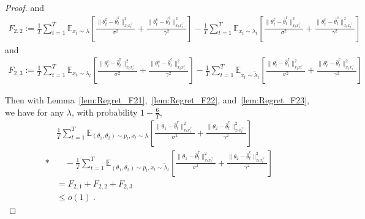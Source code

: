 \documentclass[10pt,a4paper]{amsart}
\newcommand{\hthetact}{\hat{\theta}_t^{\mathrm{c}}}
\newcommand{\hthetart}{\hat{\theta}_t^{\mathrm{r}}}
\begin{document}
\begin{proof}
and
\begin{align*}
    F_{2,2}:=\frac{1}{T} 
\sum_{t=1}^{T} \mathbb{E}_{ x_t\sim \lambda} 
\left[\frac{\|\theta_t^\mathrm{r} - \hthetart\|_{x_t x_t^\top}^2}{\sigma^2} 
+ \frac{\|\theta_t^\mathrm{c} - \hthetact\|_{x_t x_t^\top}^2}{\gamma^2}\right] 
- \frac{1}{T} 
\sum_{t=1}^{T} \mathbb{E}_{ x_t\sim \lambda_t} 
\left[\frac{\|\theta_t^\mathrm{r} - \hthetart\|_{x_t x_t^\top}^2}{\sigma^2} 
+ \frac{\|\theta_t^\mathrm{c} - \hthetact\|_{x_t x_t^\top}^2}{\gamma^2}\right]
\end{align*}
and
\begin{align*}
    F_{2,3}:=\frac{1}{T} 
\sum_{t=1}^{T} \mathbb{E}_{ x_t\sim \lambda_t} 
\left[\frac{\|\theta_t^\mathrm{r} - \hthetart\|_{x_t x_t^\top}^2}{\sigma^2} 
+ \frac{\|\theta_t^\mathrm{c} - \hthetact\|_{x_t x_t^\top}^2}{\gamma^2} \right]
-
\frac{1}{T} \sum_{t=1}^{T} \mathbb{E}_{ x_t\sim \tilde{\lambda}_t} 
\left[\frac{\|\theta_t^\mathrm{r} - \hthetart\|_{x_t x_t^\top}^2}{\sigma^2} 
+ \frac{\|\theta_t^\mathrm{c} - \hthetact\|_{x_t x_t^\top}^2}{\gamma^2}\right]
\end{align*}

Then with Lemma~\ref{lem:Regret_F21},~\ref{lem:Regret_F22}, and~\ref{lem:Regret_F23}, we have for any $\lambda$, with probability $1-\frac{6}{T}$,
\begin{align*}
    &\frac{1}{T} 
\sum_{t=1}^{T} \mathbb{E}_{(\theta_1, \theta_2) \sim p_t, x_t\sim \lambda} 
\left[ \frac{\|\theta_1 - \hthetart\|_{x_t x_t^\top}^2}{\sigma^2} 
+ \frac{\|\theta_2 - \hthetact\|_{x_t x_t^\top}^2}{\gamma^2}  \right]  \\*
&\quad
- \frac{1}{T} \sum_{t=1}^{T} \mathbb{E}_{(\theta_1, \theta_2) \sim p_t, x_t\sim \tilde{\lambda}_t} 
\left[\frac{\|\theta_1 - \hthetart\|_{x_t x_t^\top}^2}{\sigma^2} 
+ \frac{\|\theta_2 - \hthetact\|_{x_t x_t^\top}^2}{\gamma^2}\right]
\\&=F_{2,1}+F_{2,2}+F_{2,3}
\\&\le o(1)~.
\end{align*}


\end{proof}
\end{document}
